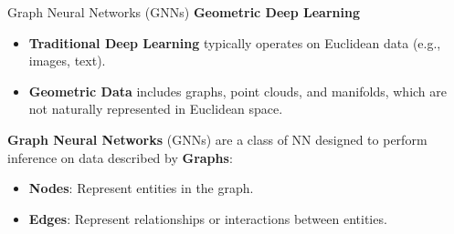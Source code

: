 \begin{frame}{Graph Neural Networks (GNNs)}
  \textbf{Geometric Deep Learning} 

  \begin{itemize}
      \item \textbf{Traditional Deep Learning} typically operates on Euclidean data (e.g., images, text).
      \item \textbf{Geometric Data} includes graphs, point clouds, and manifolds, which are not naturally represented in Euclidean space.
  \end{itemize}

  \textbf{Graph Neural Networks} (GNNs) are a class of NN designed to perform inference on data described by \textbf{Graphs}: 
  \begin{itemize}
    \item \textbf{Nodes}: Represent entities in the graph.
    \item \textbf{Edges}: Represent relationships or interactions between entities.
  \end{itemize}

\end{frame}






